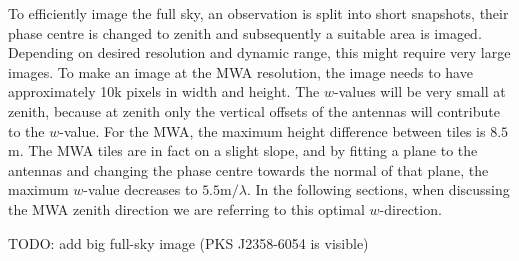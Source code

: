 \documentclass[useAMS,usenatbib]{mn2e}
\begin{document}
To efficiently image the full sky, an observation is split into short snapshots, their phase centre is changed to zenith and subsequently a suitable area is imaged. Depending on desired resolution and dynamic range, this might require very large images. To make an image at the MWA resolution, the image needs to have approximately 10k pixels in width and height. The $w$-values will be very small at zenith, because at zenith only the vertical offsets of the antennas will contribute to the $w$-value. For the MWA, the maximum height difference between tiles is $8.5$m. The MWA tiles are in fact on a slight slope, and by fitting a plane to the antennas and changing the phase centre towards the normal of that plane, the maximum $w$-value decreases to $5.5\textrm{m} / \lambda$. In the following sections, when discussing the MWA zenith direction we are referring to this optimal $w$-direction.

TODO: add big full-sky image (PKS J2358-6054 is visible)
\end{document}
